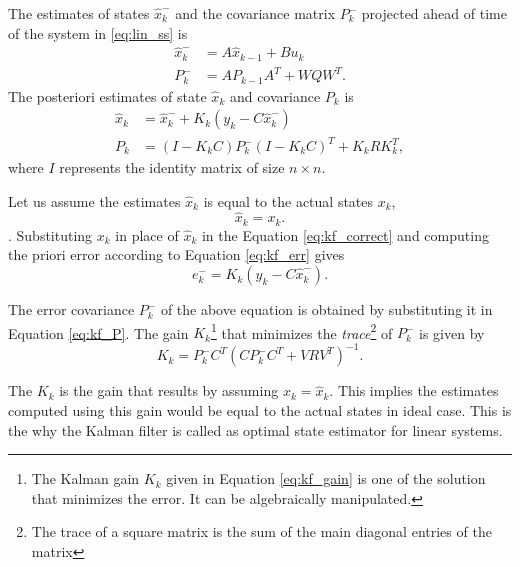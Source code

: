 The estimates of states $\hat x_k^-$ and the covariance matrix $P_k^{-}$ projected ahead of time of the system in \ref{eq:lin_ss} is
\begin{equation}
	\begin{split}
	\hat{x}_k^{-} &= A \hat x_{k-1} + B u_k \\
	P_k^- &= A P_{k-1} A^{T} + W Q W^T .
	\end{split}
\end{equation}
The posteriori estimates of state $\hat x_k$ and covariance $P_k$ is
\begin{equation} 
	\label{eq:kf_correct}
	\begin{split}
	\hat{x}_k &= \hat{x}_k^{-} + K_k(y_k - C\hat x_k^{-})\\
    {P}_{k} &= (I - {K}_k {C}) {P}_{k}^{-} (I - {K}_k {C})^{T} + {K}_k {R} {K}_k^{T},
	\end{split}
\end{equation}
where $I$ represents the identity matrix of size $n \times n$.

Let us assume the estimates $\hat x_k$ is equal to the actual states $x_k$, $$\hat{x}_k = x_k.$$. 
Substituting $x_k$ in place of $\hat x_k$ in the Equation \ref{eq:kf_correct} and computing the priori error according to Equation \ref{eq:kf_err} gives
\begin{equation}
	e_k^- =  K_k(y_k - C\hat x_k^-).
\end{equation}

The error covariance $P_k^-$ of the above equation is obtained by substituting it in Equation \ref{eq:kf_P}. The gain $K_k$\footnote{The Kalman gain $K_k$ given in Equation \ref{eq:kf_gain} is one of the solution that minimizes the error. It can be algebraically manipulated.} that minimizes the \emph{trace}\footnote{The trace of a square matrix is the sum of the main diagonal entries of the matrix} of $P_k^-$ is given by
\begin{equation} \label{eq:kf_gain}
 K_k = P_k^- C^T(C P_k^- C^T + V R V^T)^{-1}.
    \end{equation}

The $K_k$ is the gain that results by assuming $x_k=\hat x_k$. This implies the estimates computed using this gain would be equal to the actual states in ideal case. This is the why the Kalman filter is called as optimal state estimator for linear systems.

